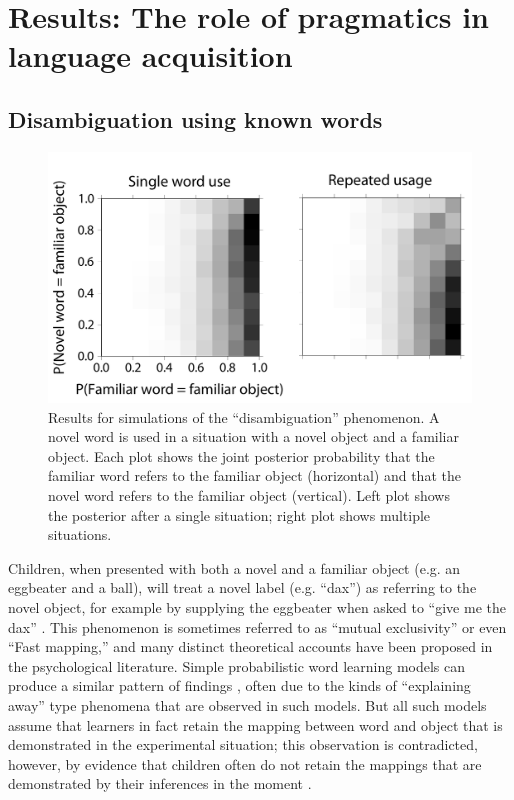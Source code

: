 \documentclass{article} %
\begin{document}
\section{Results: The role of pragmatics in language acquisition}

\subsection{Disambiguation using known words}

\begin{figure}
  \centering
\includegraphics[width=.6\textwidth]{figures/ME-composite-small.pdf}
  \caption{Results for simulations of the ``disambiguation'' phenomenon. A novel word is used in a situation with a novel object and a familiar object. Each plot shows the joint posterior probability that the familiar word refers to the familiar object (horizontal) and that the novel word refers to the familiar object (vertical). Left plot shows the posterior after a single situation; right plot shows multiple situations. 
}
  \label{fig:me}
\end{figure}

Children, when presented with both a novel and a familiar object (e.g. an eggbeater and a ball), will treat a novel label (e.g. ``dax'') as referring to the novel object, for example by supplying the eggbeater when asked to ``give me the dax'' \cite{markman1988}. This phenomenon is sometimes referred to as ``mutual exclusivity'' or even ``Fast mapping,'' and many distinct theoretical accounts have been proposed in the psychological literature. Simple probabilistic word learning models can produce a similar pattern of findings \cite{frank2009}, often due to the kinds of ``explaining away'' type phenomena that are observed in such models. But all such models assume that learners in fact retain the mapping between word and object that is demonstrated in the experimental situation; this observation is contradicted, however, by evidence that children often do not retain the mappings that are demonstrated by their inferences in the moment \cite{horst2008}. 
\end{document}
